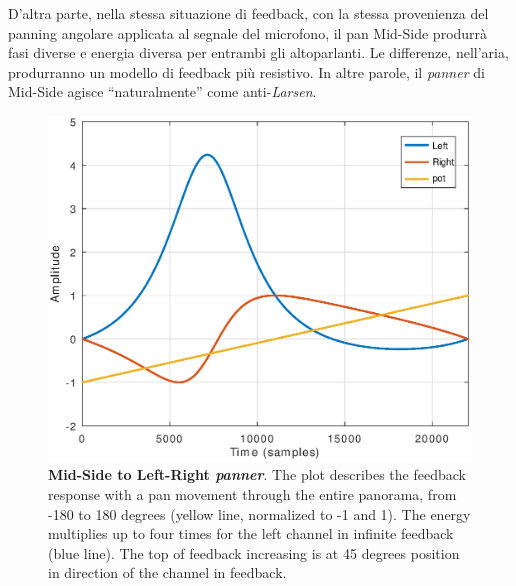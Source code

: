 D'altra parte, nella stessa situazione di feedback, con la stessa provenienza
del panning angolare applicata al segnale del microfono, il pan Mid-Side
produrrà fasi diverse e energia diversa per entrambi gli altoparlanti. Le
differenze, nell'aria, produrranno un modello di feedback più resistivo. In
altre parole, il \emph{panner} di Mid-Side agisce “naturalmente” come anti-\emph{Larsen}.


\begin{figure}[t]
\centering
\includegraphics[width=1\columnwidth]{CAPITOLI/1000/IMG/mspanlrfbpot}
\caption{\textbf{Mid-Side to Left-Right \emph{panner}}. The plot describes the feedback
response with a pan movement through the entire panorama, from -180 to 180
degrees (yellow line, normalized to -1 and 1). The energy multiplies up to four
times for the left channel in infinite feedback (blue line). The top of feedback
increasing is at 45 degrees position in direction of the channel in feedback.}
\label{fig:mspanlrfb}
\end{figure}

